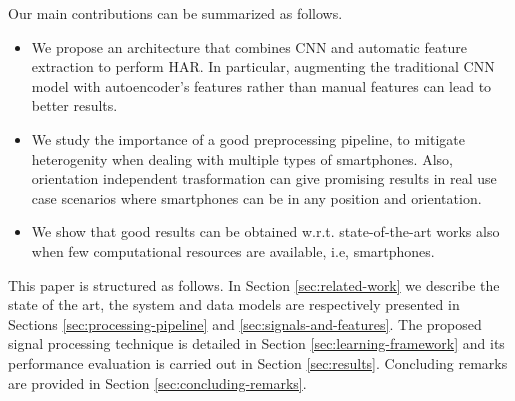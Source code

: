 Our main contributions can be summarized as follows.

\begin{itemize}
  \item We propose an architecture that combines CNN and automatic
    feature extraction to perform HAR. In particular, augmenting the
    traditional CNN model with autoencoder's features rather than
    manual features can lead to better results.
  \item We study the importance of a good preprocessing pipeline, to
    mitigate heterogenity when dealing with multiple types of
    smartphones. Also, orientation independent trasformation can give
    promising results in real use case scenarios where smartphones can
    be in any position and orientation.
  \item We show that good results can be obtained
    w.r.t. state-of-the-art works also when few computational
    resources are available, i.e, smartphones.
\end{itemize}

This paper is structured as follows. In Section \ref{sec:related-work}
we describe the state of the art, the system and data models are
respectively presented in Sections \ref{sec:processing-pipeline} and
\ref{sec:signals-and-features}. The proposed signal processing
technique is detailed in Section \ref{sec:learning-framework} and its
performance evaluation is carried out in Section
\ref{sec:results}. Concluding remarks are provided in Section
\ref{sec:concluding-remarks}.


